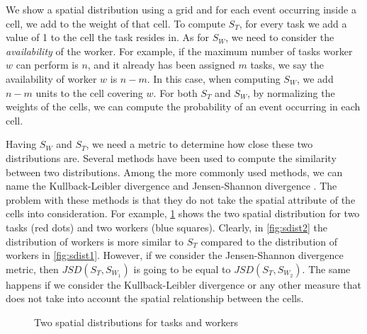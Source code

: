 We show a spatial distribution using a grid and for each event occurring inside a cell, we add to the weight of that cell. To compute $S_T$, for every task we add a value of 1 to the cell the task resides in. As for $S_W$, we need to consider the \textit{availability} of the worker. For example, if the maximum number of tasks worker $w$ can perform is $n$, and it already has been assigned $m$ tasks, we say the availability of worker $w$ is $n-m$. In this case, when computing $S_W$, we add $n-m$ units to the cell covering $w$. For both $S_T$ and $S_W$, by normalizing the weights of the cells, we can compute the probability of an event occurring in each cell.

Having $S_W$ and $S_T$, we need a metric to determine how close these two distributions are. Several methods have been used to compute the similarity between two distributions. Among the more commonly used methods, we can name the Kullback-Leibler divergence \cite{Kullback51} and Jensen-Shannon divergence \cite{Lin91}. The problem with these methods is that they do not take the spatial attribute of the cells into consideration. For example, \cref{fig:sdist} shows the two spatial distribution for two tasks (red dots) and two workers (blue squares). Clearly, in \cref{fig:sdist2} the distribution of workers is more similar to $S_T$ compared to the distribution of workers in \cref{fig:sdist1}. However, if we consider the Jensen-Shannon divergence metric, then $JSD(S_T, S_{W_1})$ is going to be equal to $JSD(S_T, S_{W_2})$. The same happens if we consider the Kullback-Leibler divergence or any other measure that does not take into account the spatial relationship between the cells.

\begin{figure}[t]
    \centering
    \caption{Two spatial distributions for tasks and workers}
    \label{fig:sdist}
\end{figure}

